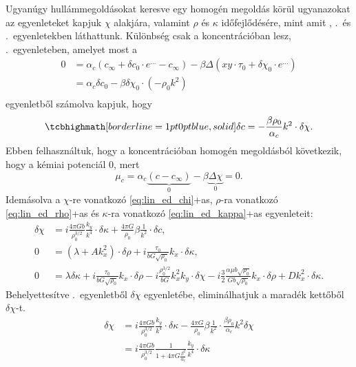 \documentclass[10pt,a4paper]{scrartcl}
\begin{document}
Ugyanúgy hullámmegoldásokat keresve egy homogén megoldás körül ugyanazokat az egyenleteket kapjuk $\chi$ alakjára, valamint $\rho$ és $\kappa$ időfejlődésére, mint amit , .\ és .\ egyenletekben láthattunk. Különbség csak a koncentrációban lesz, .\ egyenleteben, amelyet most a
\[\begin{aligned}
0 & = {\alpha _c}\left( {{c_{\infty} } + \delta {c_0} \cdot {e^{\ldots} } - {c_{\infty}}} \right) - \beta \Delta \left( {xy \cdot {\tau _0} + \delta {\chi _0} \cdot {e^{\ldots} }} \right)\\
   &  = {\alpha _c}\delta {c_0} - \beta \delta {\chi _0} \cdot \left( { - {\rho _0}{k^2}} \right) \\ 
\end{aligned}\]
egyenletből számolva kapjuk, hogy
\begin{equation} \label{eq:fd_c_elim}
\tcbhighmath[borderline={1pt}{0pt}{blue,solid}]{\delta {c} =  - \frac{{\beta {\rho _0}}}{{{\alpha _c}}}{k^2} \cdot \delta {\chi}.}
\end{equation}
Ebben felhasználtuk, hogy a koncentrációban homogén megoldásból következik, hogy a kémiai potenciál 0, mert
\[{\mu _c} = {\alpha _c}\underbrace {\left( {c - {c_\infty }} \right)}_0 - \beta \underbrace {\Delta \chi }_0 = 0.\]
Idemásolva a $\chi$-re vonatkozó \told\ref{eq:lin_ed_chi}+as{}, $\rho$-ra vonatkozó \told\ref{eq:lin_ed_rho}+as{} és $\kappa$-ra vonatkozó \told\ref{eq:lin_ed_kappa}+as{} egyenleteit:
\begin{align*}
\delta \chi & = i\frac{{4\pi Gb}}{{\rho _0^{3/2}}}\frac{{{k_y}}}{{{k^4}}} \cdot \delta \kappa  + \frac{{4\pi G}}{{{\rho _0}}}\beta \frac{1}{{{k^2}}} \cdot \delta c,\\
0 & = \left( {\lambda  + Ak_x^2} \right) \cdot \delta \rho  + i\frac{{{\tau _0}}}{{bG\sqrt {{\rho _0}} }}{k_x} \cdot \delta \kappa,\\
0 & = \lambda \delta\kappa  + i\frac{{{\tau _0}}}{{bG\sqrt {{\rho _0}} }}{k_x} \cdot \delta \rho  - i\frac{{\rho _0^{3/2}}}{{bG}}k_x^2{k_y} \cdot \delta \chi  - i\frac{3}{2}\frac{{\alpha \mu b\sqrt {{\rho _0}} }}{{Gb\sqrt {{\rho _0}} }}{k_x} \cdot \delta \rho  + Dk_x^2 \cdot \delta \kappa.
\end{align*}
Behelyettesítve .\ egyenletből $\delta\chi$ egyenletébe, eliminálhatjuk a maradék kettőből $\delta\chi$-t.
\[\begin{aligned}
  \delta \chi  &  = i\frac{{4\pi Gb}}{{\rho _0^{3/2}}}\frac{{{k_y}}}{{{k^4}}} \cdot \delta \kappa  - \frac{{4\pi G}}{{{\rho _0}}}\beta \frac{1}{{{k^2}}} \cdot \frac{{\beta {\rho _0}}}{{{\alpha _c}}}{k^2}\delta \chi  \\ 
   &  = i\frac{{4\pi Gb}}{{\rho _0^{3/2}}}\frac{1}{{1 + 4\pi G\frac{{{\beta ^2}}}{{{\alpha _c}}}}}\frac{{{k_y}}}{{{k^4}}} \cdot \delta \kappa  \\ 
\end{aligned} \]
\end{document}
